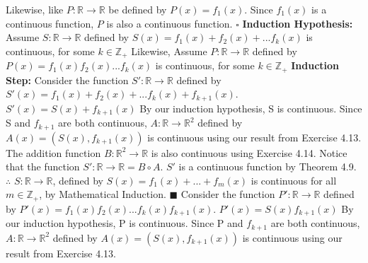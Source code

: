\documentclass[12pt]{article}
\begin{document}
  Likewise, like \(P: \mathbb{R} \rightarrow \mathbb{R}\) be defined by \(P(x) = f_1(x)\).
  \newline
  Since \(f_1(x)\) is a continuous function, \(P\) is also a continuous function.
  \newline \(\square\) \newline \newline
  \textbf{Induction Hypothesis:} Assume \(S: \mathbb{R} \rightarrow \mathbb{R}\) defined by \(S(x) = f_1(x) + f_2(x) +...f_k(x)\) is continuous, for some \(k \in \mathbb{Z}_+\)
  \newline
  Likewise, Assume \(P: \mathbb{R} \rightarrow \mathbb{R}\) defined by \(P(x) = f_1(x)f_2(x)...f_k(x)\) is continuous, for some \(k \in \mathbb{Z}_+\)
  \newline \newline
  \textbf{Induction Step:} Consider the function \(S': \mathbb{R} \rightarrow \mathbb{R}\) defined by \(S'(x) = f_1(x) + f_2(x) +...f_k(x) + f_{k+1}(x)\).
  \newline
  \(S'(x) = S(x) + f_{k+1}(x)\)
  \newline
  By our induction hypothesis, S is continuous.
  \newline
  Since S and \(f_{k+1}\) are both continuous, \(A: \mathbb{R} \rightarrow \mathbb{R}^2\) defined by \(A(x) = (S(x),f_{k+1}(x))\) is continuous using our result from Exercise 4.13.
  \newline
  The addition function \(B: \mathbb{R}^2 \rightarrow \mathbb{R}\) is also continuous using Exercise 4.14.
  \newline \newline
  Notice that the function \(S': \mathbb{R} \rightarrow \mathbb{R} = B \circ A\).
  \newline
  \(S'\) is a continuous function by Theorem 4.9.
  \newline
  \(\therefore\) \(S: \mathbb{R} \rightarrow \mathbb{R}\), defined by \(S(x) = f_1(x)+...+f_m(x)\) is continuous for all \(m \in \mathbb{Z}_+\), by Mathematical Induction.
  \newline \(\blacksquare\) \newline
  Consider the function \(P': \mathbb{R} \rightarrow \mathbb{R}\) defined by \(P'(x) = f_1(x)f_2(x)...f_k(x)f_{k+1}(x)\).
  \newline
  \(P'(x) = S(x)f_{k+1}(x)\)
  \newline
  By our induction hypothesis, P is continuous.
  \newline
  Since P and \(f_{k+1}\) are both continuous, \(A: \mathbb{R} \rightarrow \mathbb{R}^2\) defined by \(A(x) = (S(x),f_{k+1}(x))\) is continuous using our result from Exercise 4.13.
\end{document}
